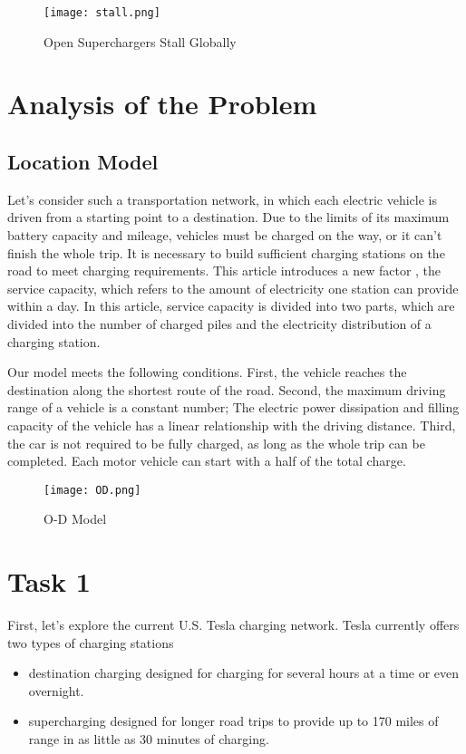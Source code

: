 \documentclass{mcmthesis}
\begin{document}
\begin{figure}[htbp]
\small
\centering
\texttt{[image: stall.png]}
\caption{Open Superchargers Stall Globally} 
\end{figure}


\section{Analysis of the Problem}

\subsection {Location Model} 

 Let's consider such a transportation network, in which each electric vehicle is driven from a starting point to a destination. Due to the limits of its maximum battery capacity and mileage, vehicles must be charged on the way, or it can’t finish the whole trip. It is necessary to build sufficient charging stations on the road to meet charging requirements. This article introduces a new factor , the service capacity,  which refers to the amount of electricity one station can provide within a day.  In this article, service capacity is divided into two parts, which are divided into the number of charged piles and the electricity distribution of a charging station.

Our model meets the following conditions. First, the vehicle reaches the destination along the shortest route of the road. Second, the maximum driving range  of a vehicle is a constant number; The electric power dissipation and filling capacity of the vehicle has a linear relationship with the driving distance. Third, the car is not required to be fully charged, as long as the whole trip can be completed. Each motor vehicle can start with a half of the total charge.

\begin{figure}[htbp]
\small
\centering
\texttt{[image: OD.png]}
\caption{O-D Model} 
\end{figure}


\section{Task 1}

First, let's explore the current U.S. Tesla charging network. Tesla currently offers two types of charging stations


\begin{itemize}
\item destination charging designed for charging for several hours at a time or even overnight.
\item supercharging designed for longer road trips to provide up to 170 miles of range in as little as 30 minutes of charging.
\end{itemize}
\end{document}
